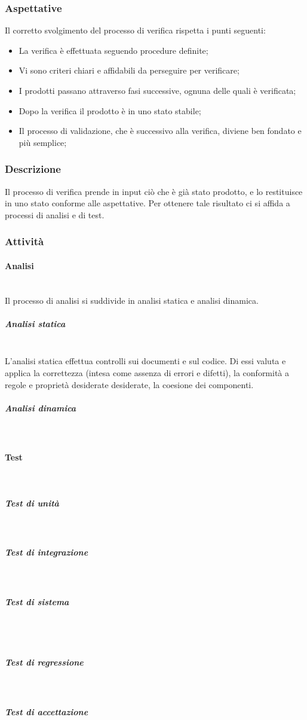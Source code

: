 		\subsubsection{Aspettative}
		Il corretto svolgimento del processo di verifica rispetta i punti seguenti:	
		\begin{itemize}
			\item La verifica è effettuata seguendo procedure definite;
			\item Vi sono criteri chiari e affidabili da perseguire per verificare;
			\item I prodotti passano attraverso fasi successive, ognuna delle quali è verificata;
			\item Dopo la verifica il prodotto è in uno stato stabile;
			\item Il processo di validazione, che è successivo alla verifica, diviene ben fondato e più semplice;
		\end{itemize}
		\subsubsection{Descrizione}
		Il processo di verifica prende in input ciò che è già stato prodotto, e lo restituisce in uno stato conforme alle aspettative. Per ottenere tale risultato ci si affida a processi di analisi e di test.
		\subsubsection{Attività}
			\paragraph{Analisi} \mbox{}\\
			Il processo di analisi si suddivide in analisi statica e analisi dinamica.
				\subparagraph{Analisi statica} \mbox{}\\
				L'analisi statica effettua controlli sui documenti e sul codice. Di essi valuta e applica la correttezza (intesa come assenza di errori e difetti), la conformità a regole e proprietà desiderate desiderate, la coesione dei componenti.
				\subparagraph{Analisi dinamica} \mbox{}\\
			\paragraph{Test} \mbox{}\\	
				\subparagraph{Test di unità} \mbox{}\\
				\subparagraph{Test di integrazione} \mbox{}\\
				\subparagraph{Test di sistema} \mbox{}\\\\
				\subparagraph{Test di regressione} \mbox{}\\
				\subparagraph{Test di accettazione} \mbox{}\\
